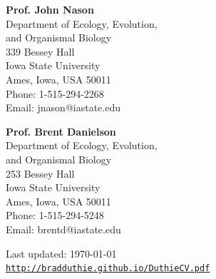 \documentclass[letterpaper]{article}
\def\footerlink{http://bradduthie.github.io/DuthieCV.pdf}
\renewenvironment{itemize}{
  \begin{list}{}{
    \setlength{\leftmargin}{1.5em}
  }
}{
  \end{list}
}
\begin{document}
\begin{minipage}{0.5\linewidth}

\begin{itemize}

\newline
\item {\bf Prof. John Nason} \\
Department of Ecology, Evolution, \\ and Organismal Biology \\
339 Bessey Hall \\
Iowa State University \\
Ames, Iowa, USA 50011 \\
Phone: 1-515-294-2268 \\
Email: jnason@iastate.edu

\item {\bf Prof. Brent Danielson} \\
Department of Ecology, Evolution, \\ and Organismal Biology \\
253 Bessey Hall \\
Iowa State University \\
Ames, Iowa, USA 50011 \\
Phone: 1-515-294-5248 \\
Email: brentd@iastate.edu
\end{itemize}

\end{minipage}

\bigskip

\begin{center}
  \begin{footnotesize}
    Last updated: \today \\
    \href{\footerlink}{\texttt{\footerlink}}
  \end{footnotesize}
\end{center}
\end{document}
